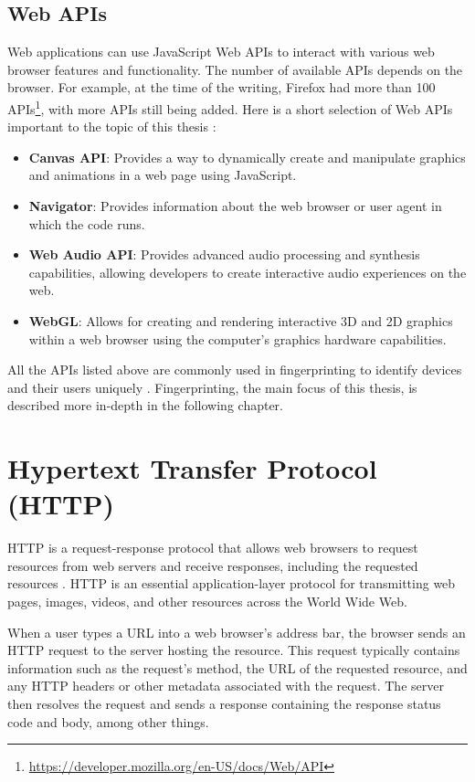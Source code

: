 \subsection{Web APIs}

Web applications can use JavaScript Web APIs to interact with various web browser features and functionality. The number of available APIs depends on the browser. For example, at the time of the writing, Firefox had more than 100 APIs\footnote{\url{https://developer.mozilla.org/en-US/docs/Web/API}}, with more APIs still being added. Here is a short selection of Web APIs important to the topic of this thesis \cite{SecurityWebDevs, SchauerDP}:

\begin{itemize}
	\item \textbf{Canvas API}: Provides a way to dynamically create and manipulate graphics and animations in a web page using JavaScript.
	\item \textbf{Navigator}: Provides information about the web browser or user agent in which the code runs.
	\item \textbf{Web Audio API}: Provides advanced audio processing and synthesis capabilities, allowing developers to create interactive audio experiences on the web.
	\item \textbf{WebGL}: Allows for creating and rendering interactive 3D and 2D graphics within a web browser using the computer's graphics hardware capabilities.
\end{itemize}

All the APIs listed above are commonly used in fingerprinting to identify devices and their users uniquely \cite{FingerprintingSurvey}. Fingerprinting, the main focus of this thesis, is described more in-depth in the following chapter.

\section{Hypertext Transfer Protocol (HTTP)}

HTTP is a request-response protocol that allows web browsers to request resources from web servers and receive responses, including the requested resources \cite{MasteringNodeJS}. HTTP is an essential application-layer protocol for transmitting web pages, images, videos, and other resources across the World Wide Web.

When a user types a URL into a web browser's address bar, the browser sends an HTTP request to the server hosting the resource. This request typically contains information such as the request's method, the URL of the requested resource, and any HTTP headers or other metadata associated with the request. The server then resolves the request and sends a response containing the response status code and body, among other things.

